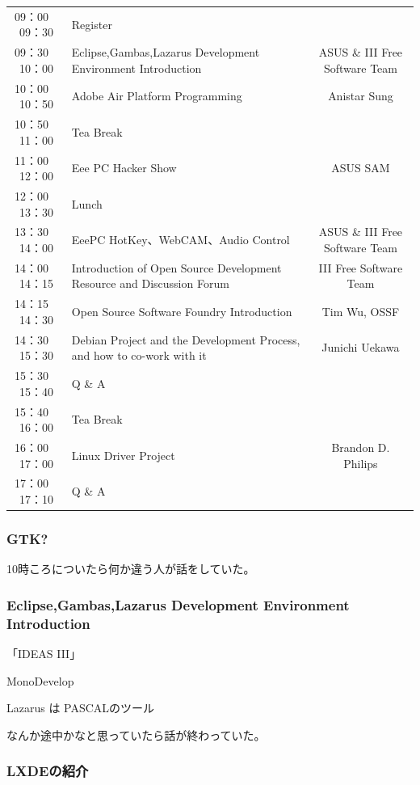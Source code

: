 \documentclass[mingoth,a4paper]{jsarticle}
\begin{document}
\begin{tabular}{|c|p{18em}|c|}
09：00 ~ 09：30 &	Register & \\
09：30 ~ 10：00 &	Eclipse,Gambas,Lazarus Development Environment Introduction& 	ASUS \& III Free Software Team\\
10：00 ~ 10：50 &	Adobe Air Platform Programming 	&Anistar Sung\\
10：50 ~ 11：00 &	Tea Break& \\
11：00 ~ 12：00 &	Eee PC Hacker Show 	&ASUS SAM\\
12：00 ~ 13：30 &	Lunch & \\
13：30 ~ 14：00 &	EeePC HotKey、WebCAM、Audio Control 	&ASUS \& III Free Software Team\\
14：00 ~ 14：15 &	Introduction of Open Source Development Resource and Discussion Forum &	III Free Software Team\\
14：15 ~ 14：30 &	Open Source Software Foundry Introduction 	&Tim Wu, OSSF\\
14：30 ~ 15：30 &	Debian Project and the Development Process, and how to co-work with it 	&Junichi Uekawa\\
15：30 ~ 15：40 &	Q \& A 	& \\
15：40 ~ 16：00 &	Tea Break & \\
16：00 ~ 17：00 &	Linux Driver Project 	&Brandon D. Philips\\
17：00 ~ 17：10 &	Q \& A 	& \\
\end{tabular}


\subsubsection{GTK?}

10時ころについたら何か違う人が話をしていた。




\subsubsection{Eclipse,Gambas,Lazarus Development Environment
   Introduction}

「IDEAS III」

MonoDevelop

Lazarus は PASCALのツール

なんか途中かなと思っていたら話が終わっていた。

\subsubsection{LXDEの紹介}
\end{document}
